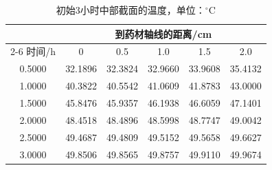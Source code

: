 \begin{table}[!htbp]\centering\small
\caption{初始3小时中部截面的温度，单位：$ {}^\circ\mathrm{C}$}\label{tab:q2-temperature}
\renewcommand{\arraystretch}{1.15}
\begin{tabular*}{0.96\textwidth}{@{\extracolsep{\fill}}cccccc}
\toprule
 & \multicolumn{5}{c}{到药材轴线的距离/cm}\\
\cmidrule(lr){2-6}
时间/h & 0 & 0.5 & 1.0 & 1.5 & 2.0\\\midrule
0.5000 & 32.1896 & 32.3824 & 32.9660 & 33.9608 & 35.4132\\
1.0000 & 40.3822 & 40.5542 & 41.0609 & 41.8783 & 43.0000\\
1.5000 & 45.8476 & 45.9357 & 46.1938 & 46.6059 & 47.1401\\
2.0000 & 48.4518 & 48.4896 & 48.5998 & 48.7747 & 49.0042\\
2.5000 & 49.4687 & 49.4809 & 49.5152 & 49.5658 & 49.6627\\
3.0000 & 49.8506 & 49.8565 & 49.8757 & 49.9110 & 49.9674\\
\bottomrule
\end{tabular*}
\end{table}
